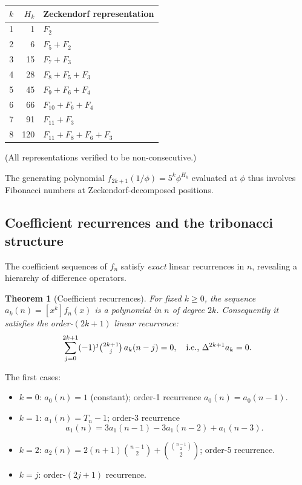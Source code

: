 \documentclass[12pt,reqno]{amsart}
\newtheorem{theorem}{Theorem}[section]
\theoremstyle{definition}
\theoremstyle{plain}
\begin{document}
\begin{center}
\begin{tabular}{rrl}
\toprule
$k$ & $H_k$ & Zeckendorf representation \\
\midrule
1 &  1 & $F_2$ \\
2 &  6 & $F_5+F_2$ \\
3 & 15 & $F_7+F_3$ \\
4 & 28 & $F_8+F_5+F_3$ \\
5 & 45 & $F_9+F_6+F_4$ \\
6 & 66 & $F_{10}+F_6+F_4$ \\
7 & 91 & $F_{11}+F_3$ \\
8 &120 & $F_{11}+F_8+F_6+F_3$ \\
\bottomrule
\end{tabular}
\end{center}
(All representations verified to be non-consecutive.)

The generating polynomial $f_{2k+1}(1/\phi)=5^k\phi^{H_k}$ evaluated at
$\phi$ thus involves Fibonacci numbers at Zeckendorf-decomposed positions.

\subsection{Coefficient recurrences and the tribonacci structure}
\label{ssec:tribonacci}

The coefficient sequences of $f_n$ satisfy \emph{exact} linear recurrences
in $n$, revealing a hierarchy of difference operators.

\begin{theorem}[Coefficient recurrences]\label{thm:coeff-rec}
For fixed $k\ge 0$, the sequence $a_k(n)=[x^k]f_n(x)$ is a polynomial in
$n$ of degree $2k$.  Consequently it satisfies the order-$(2k+1)$ linear
recurrence:
\[
  \sum_{j=0}^{2k+1}(-1)^j\tbinom{2k+1}{j}\,a_k(n-j)=0,
  \quad\text{i.e., }\Delta^{2k+1}a_k=0.
\]
\end{theorem}

The first cases:
\begin{itemize}
\item $k=0$: $a_0(n)=1$ (constant); order-1 recurrence $a_0(n)=a_0(n-1)$.
\item $k=1$: $a_1(n)=T_n-1$; order-3 recurrence
  \[
    a_1(n)=3a_1(n-1)-3a_1(n-2)+a_1(n-3).
  \]
\item $k=2$: $a_2(n)=2(n+1)\binom{n-1}{2}+\binom{\binom{n-1}{2}}{2}$;
  order-5 recurrence.
\item $k=j$: order-$(2j+1)$ recurrence.
\end{itemize}
\end{document}
